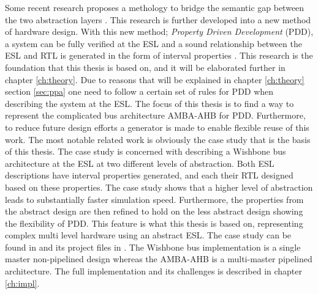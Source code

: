 Some recent research proposes a methology to bridge the semantic gap between the two abstraction layers \cite{2014-UrdahlStoffel.etal}. This research is further developed into a new method of hardware design. With this new method; \textit{Property Driven Development} (PDD), a system can be fully verified at the ESL and a sound relationship between the ESL and RTL is generated in the form of interval properties \cite{pddref}. This research is the foundation that this thesis is based on, and it will be elaborated further in chapter \ref{ch:theory}. Due to reasons that will be explained in chapter \ref{ch:theory} section \ref{sec:ppa} one need to follow a certain set of rules for PDD when describing the system at the ESL. The focus of this thesis is to find a way to represent the complicated bus architecture AMBA-AHB for PDD. Furthermore, to reduce future design efforts a generator is made to enable flexible reuse of this work. The most notable related work is obviously the case study that is the basis of this thesis. The case study is concerned with describing a Wishbone bus architecture at the ESL at two different levels of abstraction. Both ESL descriptions have interval properties generated, and each their RTL designed based on these properties. The case study shows that a higher level of abstraction leads to substantially faster simulation speed. Furthermore, the properties from the abstract design are then refined to hold on the less abstract design showing the flexibility of PDD. This feature is what this thesis is based on, representing complex multi level hardware using an abstract ESL. The case study can be found in \cite{pddref} and its project files in \cite{descam}. The Wishbone bus implementation is a single master non-pipelined design whereas the AMBA-AHB is a multi-master pipelined architecture. The full implementation and its challenges is described in chapter \ref{ch:impl}.          




 


